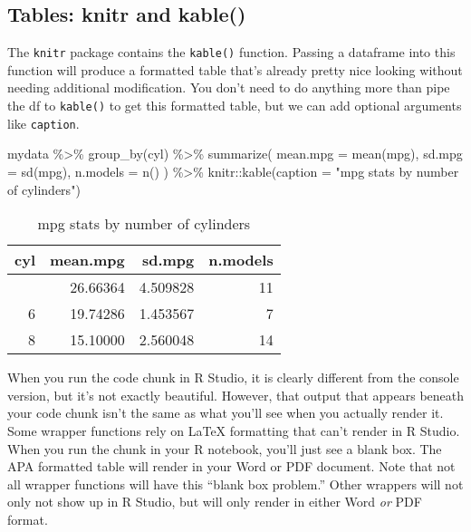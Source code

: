 \documentclass[
  letterpaper,
  DIV=11,
  numbers=noendperiod]{scrartcl}
\newenvironment{Shaded}{\begin{snugshade}}{\end{snugshade}}
\newcommand{\AttributeTok}[1]{\textcolor[rgb]{0.40,0.45,0.13}{#1}}
\newcommand{\FunctionTok}[1]{\textcolor[rgb]{0.28,0.35,0.67}{#1}}
\newcommand{\NormalTok}[1]{\textcolor[rgb]{0.00,0.23,0.31}{#1}}
\newcommand{\SpecialCharTok}[1]{\textcolor[rgb]{0.37,0.37,0.37}{#1}}
\newcommand{\StringTok}[1]{\textcolor[rgb]{0.13,0.47,0.30}{#1}}
\begin{document}
\subsection{Tables: knitr and kable()}\label{tables-knitr-and-kable}

The \texttt{knitr} package contains the \texttt{kable()} function.
Passing a dataframe into this function will produce a formatted table
that's already pretty nice looking without needing additional
modification. You don't need to do anything more than pipe the df to
\texttt{kable()} to get this formatted table, but we can add optional
arguments like \texttt{caption}.

\begin{Shaded}
\begin{Highlighting}[]
\NormalTok{mydata }\SpecialCharTok{\%\textgreater{}\%}
  \FunctionTok{group\_by}\NormalTok{(cyl) }\SpecialCharTok{\%\textgreater{}\%}
  \FunctionTok{summarize}\NormalTok{(}
    \AttributeTok{mean.mpg =} \FunctionTok{mean}\NormalTok{(mpg),}
    \AttributeTok{sd.mpg =} \FunctionTok{sd}\NormalTok{(mpg),}
    \AttributeTok{n.models =} \FunctionTok{n}\NormalTok{()}
\NormalTok{  ) }\SpecialCharTok{\%\textgreater{}\%}
\NormalTok{  knitr}\SpecialCharTok{::}\FunctionTok{kable}\NormalTok{(}\AttributeTok{caption =} \StringTok{"mpg stats by number of cylinders"}\NormalTok{)}
\end{Highlighting}
\end{Shaded}

\begin{longtable}[]{@{}rrrr@{}}

\caption{\label{tbl-avgmpg-kablestyle}mpg stats by number of cylinders}

\tabularnewline

\toprule\noalign{}
cyl & mean.mpg & sd.mpg & n.models \\
\midrule\noalign{}
\endhead
\bottomrule\noalign{}
\endlastfoot
4 & 26.66364 & 4.509828 & 11 \\
6 & 19.74286 & 1.453567 & 7 \\
8 & 15.10000 & 2.560048 & 14 \\

\end{longtable}

When you run the code chunk in R Studio, it is clearly different from
the console version, but it's not exactly beautiful. However, that
output that appears beneath your code chunk isn't the same as what
you'll see when you actually render it. Some wrapper functions rely on
LaTeX formatting that can't render in R Studio. When you run the chunk
in your R notebook, you'll just see a blank box. The APA formatted table
will render in your Word or PDF document. Note that not all wrapper
functions will have this ``blank box problem.'' Other wrappers will not
only not show up in R Studio, but will only render in either Word
\emph{or} PDF format.
\end{document}
